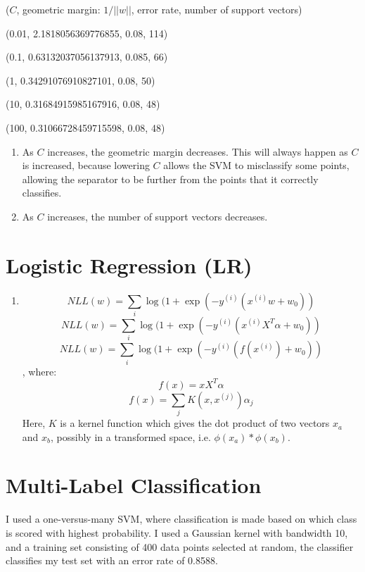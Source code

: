 \documentclass{paper}
\begin{document}
\begin{enumerate}
            ($C$, geometric margin: $1/||w||$, error rate, number of support vectors)
            
            (0.01, 2.1818056369776855, 0.08, 114)
            
            (0.1, 0.63132037056137913, 0.085, 66)
            
            (1, 0.34291076910827101, 0.08, 50)
            
            (10, 0.31684915985167916, 0.08, 48)
            
            (100, 0.31066728459715598, 0.08, 48)

    \begin{enumerate}

        \item

            As $C$ increases, the geometric margin decreases. This will always happen as $C$ is increased, because lowering $C$ allows the SVM to misclassify some points, allowing the separator to be further from the points that it correctly classifies. 

        \item

            As $C$ increases, the number of support vectors decreases.
    \end{enumerate}

\end{enumerate}

\section{Logistic Regression (LR)}

\begin{enumerate}
    \item
    \[ NLL(w) = \sum_i \log(1 + \exp(-y^{(i)} (x^{(i)} w + w_0)  ) \]
    \[ NLL(w) = \sum_i \log(1 + \exp(-y^{(i)} (x^{(i)} X^T \alpha + w_0)  ) \]
    \[ NLL(w) = \sum_i \log(1 + \exp(-y^{(i)} (f(x^{(i)}) + w_0)  ) \], where:
    \[ f(x) = x X^T \alpha \]
    \[ f(x) = \sum_j K(x, x^{(j)}) \alpha_j \]
    Here, $K$ is a kernel function which gives the dot product of two vectors $x_a$ and $x_b$, possibly in a transformed space, i.e. $\phi(x_a)*\phi(x_b)$.

\end{enumerate}

\section{Multi-Label Classification}

I used a one-versus-many SVM, where classification is made based on which class is scored with highest probability. I used a Gaussian kernel with bandwidth 10, and a training set consisting of 400 data points selected at random, the classifier classifies my test set with an error rate of 0.8588. 
\end{document}
